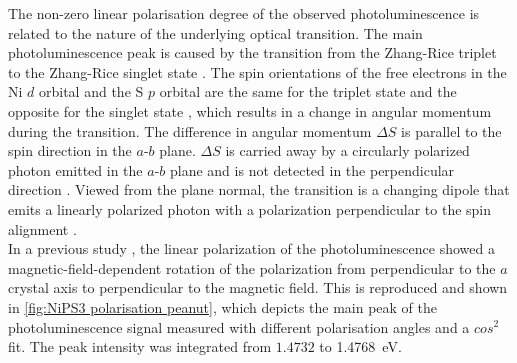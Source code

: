 \documentclass[
	twoside,
	parskip=half,
	a4paper,
]{scrbook}
\begin{document}
The non-zero linear polarisation degree of the observed photoluminescence is related to the nature of the underlying optical transition.
The main photoluminescence peak is caused by the transition from the Zhang-Rice triplet to the Zhang-Rice singlet state \cite{NiPS3_coherent}.
The spin orientations of the free electrons in the Ni $d$ orbital and the S $p$ orbital are the same for the triplet state and the opposite for the singlet state \cite{NiPS3_coherent}, which results in a change in angular momentum during the transition.
The difference in angular momentum $\Delta S$ is parallel to the spin direction in the $a$-$b$ plane.
$\Delta S$ is carried away by a circularly polarized photon emitted in the $a$-$b$ plane and is not detected in the perpendicular direction \cite{NiPS3_linear}.
Viewed from the plane normal, the transition is a changing dipole that emits a linearly polarized photon with a polarization perpendicular to the spin alignment \cite{NiPS3_linear}.\\
In a previous study \cite{NiPS3_linear}, the linear polarization of the photoluminescence showed a magnetic-field-dependent rotation of the polarization from perpendicular to the $a$ crystal axis to perpendicular to the magnetic field.
This is reproduced and shown in \autoref{fig:NiPS3 polarisation peanut}, which depicts the main peak of the photoluminescence signal measured with different polarisation angles and a $cos^2$ fit. The peak intensity was integrated from ${1.4732}$ to \SI{1.4768}{eV}. 
\end{document}
